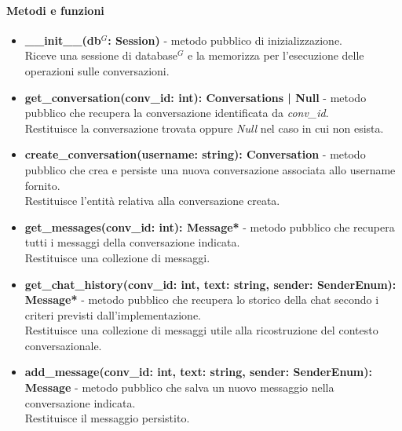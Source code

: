 \paragraph{Metodi e funzioni}
\begin{itemize}
	\item \textbf{\_\_init\_\_(db$^G$: Session)} - metodo pubblico di inizializzazione.\\
	Riceve una sessione di database$^G$ e la memorizza per l'esecuzione delle operazioni sulle conversazioni.
	\item \textbf{get\_conversation(conv\_id: int): Conversations | Null} - metodo pubblico che recupera la conversazione identificata da \textit{conv\_id}.\\
	Restituisce la conversazione trovata oppure \textit{Null} nel caso in cui non esista.
	\item \textbf{create\_conversation(username: string): Conversation} - metodo pubblico che crea e persiste una nuova conversazione associata allo username fornito.\\
	Restituisce l'entit\`a relativa alla conversazione creata.
	\item \textbf{get\_messages(conv\_id: int): Message*} - metodo pubblico che recupera tutti i messaggi della conversazione indicata.\\
	Restituisce una collezione di messaggi.
	\item \textbf{get\_chat\_history(conv\_id: int, text: string, sender: SenderEnum): Message*} - metodo pubblico che recupera lo storico della chat secondo i criteri previsti dall'implementazione.\\
	Restituisce una collezione di messaggi utile alla ricostruzione del contesto conversazionale.
	\item \textbf{add\_message(conv\_id: int, text: string, sender: SenderEnum): Message} - metodo pubblico che salva un nuovo messaggio nella conversazione indicata.\\
	Restituisce il messaggio persistito.
\end{itemize}
